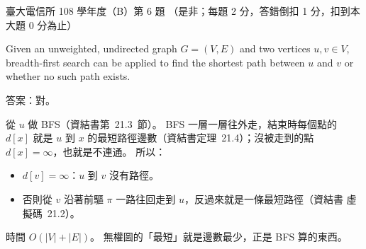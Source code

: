 \begin{pastexam}[label={px:ntu-108-comm-dsab-06}]{臺大電信所 108 學年度（B）第 6 題}
（是非；每題 2 分，答錯倒扣 1 分，扣到本大題 0 分為止）

Given an unweighted, undirected graph $G=(V,E)$ and two vertices $u,v\in V$, breadth-first search
can be applied to find the shortest path between $u$ and $v$ or whether no such path exists.
\end{pastexam}

\begin{pastsoln}
答案：對。

從 $u$ 做 BFS（資結書第~21.3~節）。 BFS 一層一層往外走，結束時每個點的 $d[x]$ 就是 $u$ 到 $x$
的最短路徑邊數（資結書定理~21.4）；沒被走到的點 $d[x] = \infty$，也就是不連通。 所以：
\begin{itemize}
\item $d[v] = \infty$：$u$ 到 $v$ 沒有路徑。
\item 否則從 $v$ 沿著前驅 $\pi$ 一路往回走到 $u$，反過來就是一條最短路徑（資結書
虛擬碼~21.2）。
\end{itemize}
時間 $O(|V| + |E|)$。 無權圖的「最短」就是邊數最少，正是 BFS 算的東西。
\end{pastsoln}
